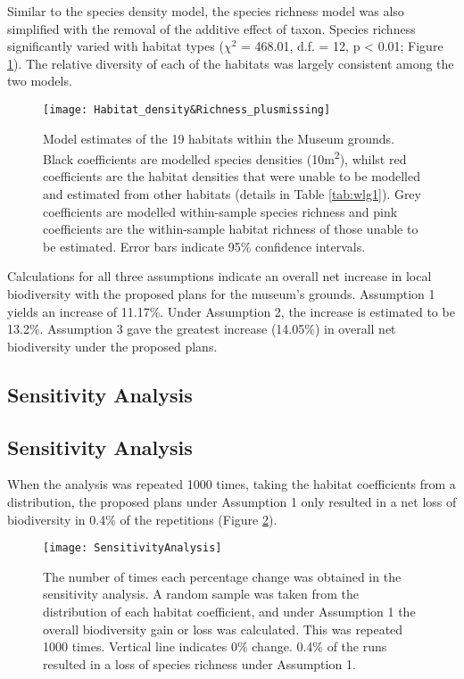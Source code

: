 Similar to the species density model, the species richness model was also simplified with the removal of the additive effect of taxon. Species richness significantly varied with habitat types ($\chi^2$ = 468.01, d.f. = 12, p < 0.01; Figure \ref{fig:wlgmodel}). The relative diversity of each of the habitats was largely consistent among the two models.
 	 
\begin{figure}[t]
	\centering
	\texttt{[image: Habitat\_density\&Richness\_plusmissing]}
	\caption{Model estimates of the 19 habitats within the Museum grounds. Black coefficients are modelled species densities (10m\textsuperscript{2}), whilst red coefficients are the habitat densities that were unable to be modelled and estimated from other habitats (details in Table \ref{tab:wlg1}). Grey coefficients are modelled within-sample species richness and pink coefficients are the within-sample habitat richness of those unable to be estimated. Error bars indicate 95\% confidence intervals.}
   	 \label{fig:wlgmodel}
\end{figure}
	
Calculations for all three assumptions indicate an overall net increase in local biodiversity with the proposed plans for the museum's grounds. Assumption 1 yields an increase of 11.17\%. Under Assumption 2, the increase is estimated to be 13.2\%. Assumption 3 gave the greatest increase (14.05\%) in overall net biodiversity under the proposed plans.

\ifappendixStyle %
\subsection{Sensitivity Analysis}%
\else
\subsection*{Sensitivity Analysis}
\fi

When the analysis was repeated 1000 times, taking the habitat coefficients from a distribution, the proposed plans under Assumption 1 only resulted in a net loss of biodiversity in 0.4\% of the repetitions (Figure \ref{fig:wlgsensitivity}).

\begin{figure}[t]
	\centering
	\texttt{[image: SensitivityAnalysis]}
	\caption{The number of times each percentage change was obtained in the sensitivity analysis. A random sample was taken from the distribution of each habitat coefficient, and under Assumption 1 the overall biodiversity gain or loss was calculated. This was repeated 1000 times. Vertical line indicates 0\% change. 0.4\% of the runs resulted in a loss of species richness under Assumption 1.}
   	 \label{fig:wlgsensitivity}
\end{figure}

